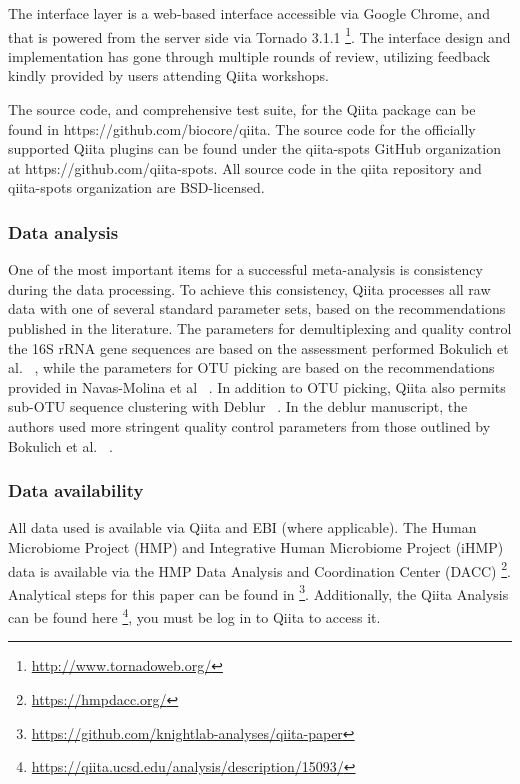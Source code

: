 The interface layer is a web-based interface accessible via Google Chrome, and that
is powered from the server side via Tornado 3.1.1 \footnote{\url{http://www.tornadoweb.org/}}.
The interface design and implementation has gone through multiple rounds of review,
utilizing feedback kindly provided by users attending Qiita workshops.

The source code, and comprehensive test suite, for the Qiita package can be found
in https://github.com/biocore/qiita. The source code for the officially supported
Qiita plugins can be found under the qiita-spots GitHub organization at
https://github.com/qiita-spots. All source code in the qiita repository and
qiita-spots organization are BSD-licensed.

\subsubsection{Data analysis}
One of the most important items for a successful meta-analysis is consistency
during the data processing. To achieve this consistency, Qiita processes all
raw data with one of several standard parameter sets, based on the recommendations
published in the literature. The parameters for demultiplexing and quality control
the 16S rRNA gene sequences are based on the assessment performed Bokulich et al. ~\cite{Bokulich2013},
while the parameters for OTU picking are based on the recommendations provided in
Navas-Molina et al ~\cite{Navas-Molina2013}. In addition to OTU picking,
Qiita also permits sub-OTU sequence clustering with Deblur ~\cite{Amir2017}. In
the deblur manuscript, the authors used more stringent quality control
parameters from those outlined by Bokulich et al. ~\cite{Bokulich2013}.

\subsubsection{Data availability}

All data used is available via Qiita and EBI (where applicable). The Human Microbiome
Project (HMP) and Integrative Human Microbiome Project (iHMP) data is available
via the HMP Data Analysis and Coordination Center (DACC) \footnote{\url{https://hmpdacc.org/}}.
Analytical steps for this paper can be found in \footnote{\url{https://github.com/knightlab-analyses/qiita-paper}}.
Additionally, the Qiita Analysis can be found here \footnote{\url{https://qiita.ucsd.edu/analysis/description/15093/}},
you must be log in to Qiita to access it.
